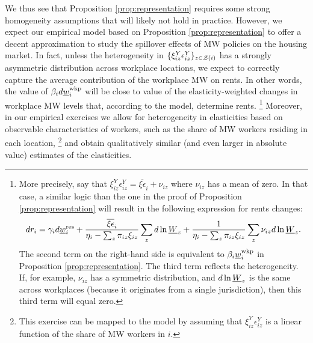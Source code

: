 We thus see that Proposition \ref{prop:representation} requires some strong 
homogeneity assumptions that will likely not hold in practice.
However, we expect our empirical model based on Proposition 
\ref{prop:representation} to offer a decent approximation to study the spillover
effects of MW policies on the housing market.
In fact, unless the heterogeneity in $\{\xi_{iz}^Y\epsilon_{iz}^Y\}_{z\in\mathcal{Z}(i)}$ 
has a strongly asymmetric distribution across workplace locations, we expect to 
correctly capture the average contribution of the workplace MW on rents.
In other words, the value of $\beta_i  d \underline{w}^{\text{wkp}}_i$ will be close to value of 
the elasticity-weighted changes in workplace MW levels that, according to the 
model, determine rents.%
\footnote{More precisely, say that 
$\xi^Y_{iz}\epsilon_{iz}^Y = \overline{\xi\epsilon}_i + \nu_{iz}$ where 
$\nu_{iz}$ has a mean of zero.
In that case, a similar logic than the one in the proof of 
Proposition \ref{prop:representation} will result in  the following expression 
for rents changes:
$$
    d r_i = \gamma_i d \underline{w}^{\text{res}}_i
          + \frac{\overline{\xi\epsilon}_i}
                 {\eta_{i} - \sum_z \pi_{iz} \xi_{iz}} \sum_z d\ln \underline{W}_z
          + \frac{1}
                 {\eta_{i} - \sum_z \pi_{iz} \xi_{iz}} \sum_z \nu_{iz} d\ln \underline{W}_z .
$$
The second term on the right-hand side is equivalent to $\beta_i \underline{w}_{i}^{\text{wkp}}$
in Proposition \ref{prop:representation}.
The third term reflects the heterogeneity.
If, for example, $\nu_{iz}$ has a symmetric distribution, and
$d\ln \underline{W}_z$ is the same across workplaces (because it originates from
a single jurisdiction), then this third term will equal zero.}
Moreover, in our empirical exercises we allow for heterogeneity in elasticities
based on observable characteristics of workers, 
such as the share of MW workers residing in each location,%
\footnote{This exercise can be mapped to the model by assuming that 
$\xi^Y_{iz} \epsilon_{iz}^Y$ is a linear function of the share of MW workers
in $i$.}
and obtain qualitatively similar (and even larger in absolute value) estimates 
of the elasticities.
